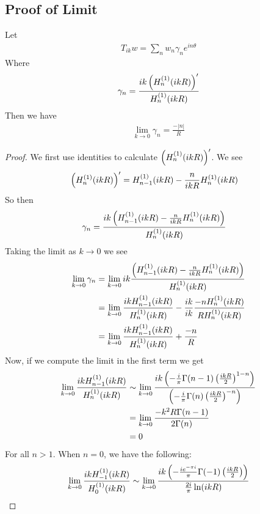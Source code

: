 \documentclass[]{article}
\begin{document}
	\subsection{Proof of Limit}
	\begin{tcbtheorem}[label=th:gammalimit]{}{}
		Let
		\begin{align}
			T_{ik}w = \sum_n w_n\gamma_ne^{in\theta}
		\end{align}
		Where
		\begin{align}
			\gamma_n = \frac{ik\left( {H^{(1)}_n(ikR)} \right)^\prime}{H^{(1)}_n(ikR)}
		\end{align}
		Then we have 
		\begin{align}
			\lim_{k\to 0}\gamma_n = \frac{-|n|}{R}
		\end{align}
	\end{tcbtheorem}
	\begin{proof}
		We first use identities  to calculate $\left( {H^{(1)}_n(ikR)} \right)^\prime$. We see
		\begin{align}
			\left( {H^{(1)}_n(ikR)} \right)^\prime &= H^{(1)}_{n-1}(ikR)- \frac{n}{ikR}H^{(1)}_n(ikR)
		\end{align}
		So then 
		\begin{align}
			\gamma_n &= \frac{ik\left( {H^{(1)}_{n-1}(ikR)- \frac{n}{ikR}H^{(1)}_n(ikR)} \right)}{H^{(1)}_n(ikR)}
		\end{align}
		Taking the limit as $k\to 0$ we see
		\begin{align}
			\lim_{k\to 0}\gamma_n &= \lim_{k\to 0}ik\frac{\left( {H^{(1)}_{n-1}(ikR)- \frac{n}{ikR}H^{(1)}_n(ikR)} \right)}{H^{(1)}_n(ikR)}\\
			 &= \lim_{k\to 0}\frac{ikH^{(1)}_{n-1}(ikR)}{H^{(1)}_n(ikR)} - \frac{ik}{ik}\frac{- nH^{(1)}_n(ikR)}{RH^{(1)}_n(ikR)}\\
			 &= \lim_{k\to 0}\frac{ikH^{(1)}_{n-1}(ikR)}{H^{(1)}_n(ikR)} +\frac{-n}{R}
		\end{align}
		Now, if we compute the limit in the first term we get
		\begin{align}
			\lim_{k\to 0}\frac{ikH^{(1)}_{n-1}(ikR)}{H^{(1)}_n(ikR)} &\sim \lim_{k\to 0}\frac{ik\left( {-\frac{i}{\pi}\Gamma(n-1)\left( {\frac{ikR}{2}} \right)^{1-n}} \right)}{\left( {-\frac{i}{\pi}\Gamma(n)\left( {\frac{ikR}{2}} \right)^{-n}} \right)}\\
			&= \lim_{k\to 0}\frac{-k^2 R\Gamma(n-1)}{2\Gamma(n)}\\
			&= 0
		\end{align}
		For all $n>1$. When $n=0$, we have the following:
		\begin{align}
			\lim_{k\to 0}\frac{ikH^{(1)}_{-1}(ikR)}{H^{(1)}_0(ikR)} &\sim \lim_{k\to 0}\frac{ik\paren{-\frac{ie^{-\pi i}}{\pi}\Gamma(-1)\paren{\frac{ikR}{2}}}}{\frac{2i}{\pi}\ln(ikR)} \\

\end{align}
\end{proof}
\end{document}
